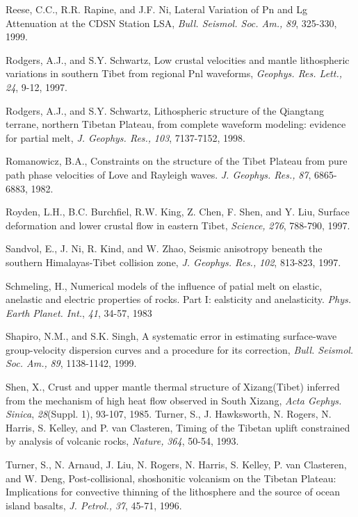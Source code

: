 \documentclass[12pt]{article}
\begin{document}
\begin{references}
Reese, C.C., R.R. Rapine, and J.F. Ni, Lateral Variation of Pn and Lg
Attenuation at the CDSN Station LSA, {\it Bull. Seismol. Soc. Am.,} {\it 89},
325-330, 1999.

Rodgers, A.J., and S.Y. Schwartz, Low crustal velocities and mantle
lithospheric variations in southern Tibet from regional Pnl waveforms,
{\it Geophys. Res. Lett.,} {\it 24}, 9-12, 1997.

Rodgers, A.J., and S.Y. Schwartz, Lithospheric structure of the
Qiangtang terrane, northern Tibetan Plateau, from complete waveform 
modeling: evidence for partial melt, {\it J. Geophys. Res.,} {\it 103}, 
7137-7152, 1998.

Romanowicz, B.A., Constraints on the structure of the Tibet Plateau
from pure path phase velocities of Love and Rayleigh waves. {\it J. Geophys.
Res.,} {\it 87}, 6865-6883, 1982.

Royden, L.H., B.C. Burchfiel, R.W. King, Z. Chen, F. Shen, and Y. Liu,
Surface deformation and lower crustal flow in eastern Tibet, {\it Science,}
{\it 276}, 788-790, 1997.

Sandvol, E., J. Ni, R. Kind, and W. Zhao, Seismic anisotropy
beneath the southern Himalayas-Tibet collision zone, {\it J. Geophys. Res.,}
{\it 102}, 813-823, 1997.

Schmeling, H., Numerical models of the influence of patial melt on
elastic, anelastic and electric properties of rocks. Part I:
ealsticity and anelasticity. {\it Phys. Earth Planet. Int.}, {\it 41}, 
34-57, 1983

Shapiro, N.M., and S.K. Singh, A systematic error in estimating
surface-wave group-velocity dispersion curves and a procedure for its
correction, {\it Bull. Seismol. Soc. Am.,} {\it 89}, 1138-1142, 1999.

Shen, X., Crust and upper mantle thermal structure of Xizang(Tibet)
inferred from the mechanism of high heat flow observed in South
Xizang, {\it Acta Gephys. Sinica}, {\it 28}(Suppl. 1), 93-107, 1985.
Turner, S., J. Hawksworth, N. Rogers, N. Harris, S. Kelley, and P. van 
Clasteren, Timing of the Tibetan uplift constrained
by analysis of volcanic rocks, {\it Nature,} {\it 364}, 50-54, 1993.

Turner, S., N. Arnaud, J. Liu, N. Rogers, N. Harris, S. Kelley, P. van
Clasteren, and W. Deng, Post-collisional, shoshonitic volcanism
on the Tibetan Plateau: Implications for convective thinning of the
lithosphere and the source of ocean island basalts, {\it J. Petrol.,}
{\it 37}, 45-71, 1996.


\end{references}
\end{document}
